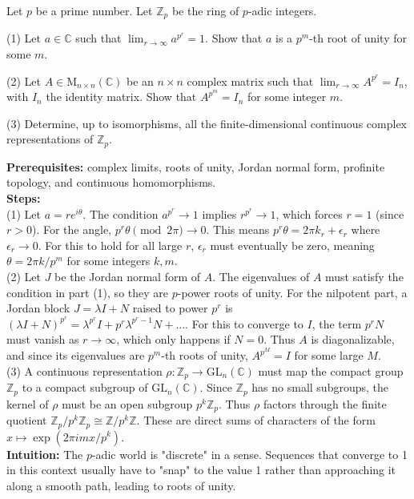 \begin{exercise}
\label{algebra:2023:5}
Let $p$ be a prime number. Let $\mathbb{Z}_p$ be the ring of $p$-adic integers.

(1) Let $a \in \mathbb{C}$ such that $\lim_{r\to\infty} a^{p^r} = 1$. Show that $a$ is a $p^m$-th root of unity for some $m$.

(2) Let $A \in \mathrm{M}_{n\times n}(\mathbb{C})$ be an $n \times n$ complex matrix such that $\lim_{r\to\infty} A^{p^r} = I_n$, with $I_n$ the identity matrix. Show that $A^{p^m} = I_n$ for some integer $m$.

(3) Determine, up to isomorphisms, all the finite-dimensional continuous complex representations of $\mathbb{Z}_p$.
\end{exercise}

\begin{solution}
\textbf{Prerequisites:} complex limits, roots of unity, Jordan normal form, profinite topology, and continuous homomorphisms. \\[2ex]

\textbf{Steps:} \\[2ex]
(1) Let $a = re^{i\theta}$. The condition $a^{p^r} \to 1$ implies $r^{p^r} \to 1$, which forces $r=1$ (since $r > 0$). For the angle, $p^r \theta \pmod{2\pi} \to 0$. This means $p^r \theta = 2\pi k_r + \epsilon_r$ where $\epsilon_r \to 0$. For this to hold for all large $r$, $\epsilon_r$ must eventually be zero, meaning $\theta = 2\pi k / p^m$ for some integers $k, m$. \\[2ex]

(2) Let $J$ be the Jordan normal form of $A$. The eigenvalues of $A$ must satisfy the condition in part (1), so they are $p$-power roots of unity. For the nilpotent part, a Jordan block $J = \lambda I + N$ raised to power $p^r$ is $(\lambda I + N)^{p^r} = \lambda^{p^r} I + p^r \lambda^{p^r-1} N + \dots$. For this to converge to $I$, the term $p^r N$ must vanish as $r \to \infty$, which only happens if $N=0$. Thus $A$ is diagonalizable, and since its eigenvalues are $p^m$-th roots of unity, $A^{p^M} = I$ for some large $M$. \\[2ex]

(3) A continuous representation $\rho: \mathbb{Z}_p \to \mathrm{GL}_n(\mathbb{C})$ must map the compact group $\mathbb{Z}_p$ to a compact subgroup of $\mathrm{GL}_n(\mathbb{C})$. Since $\mathbb{Z}_p$ has no small subgroups, the kernel of $\rho$ must be an open subgroup $p^k \mathbb{Z}_p$. Thus $\rho$ factors through the finite quotient $\mathbb{Z}_p / p^k \mathbb{Z}_p \cong \mathbb{Z}/p^k \mathbb{Z}$. These are direct sums of characters of the form $x \mapsto \exp(2\pi i m x / p^k)$. \\[2ex]

\textbf{Intuition:} The $p$-adic world is "discrete" in a sense. Sequences that converge to 1 in this context usually have to "snap" to the value 1 rather than approaching it along a smooth path, leading to roots of unity.
\end{solution}

